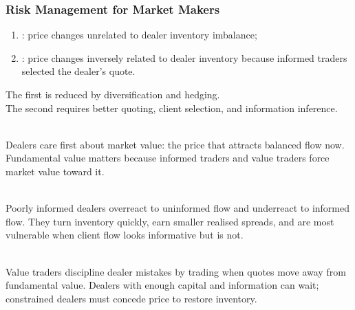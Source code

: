 \subsubsection{Risk Management for Market Makers}

\begin{taxonomy} 
\begin{enumerate}[label=\roman*.]
\setlength{\itemsep}{0pt}
\item {}: price changes unrelated to dealer inventory imbalance;
\item {}: price changes inversely related to dealer inventory because informed traders selected the dealer's quote.
\end{enumerate}
The first is reduced by diversification and hedging.\\
The second requires better quoting, client selection, and information inference.
\end{taxonomy}

\begin{principle} \\
Dealers care first about market value: the price that attracts balanced flow now. Fundamental value matters because informed traders and value traders force market value toward it.
\end{principle}

\begin{caveat} \\
Poorly informed dealers overreact to uninformed flow and underreact to informed flow. They turn inventory quickly, earn smaller realised spreads, and are most vulnerable when client flow looks informative but is not.
\end{caveat}

\begin{mechanism} \\
Value traders discipline dealer mistakes by trading when quotes move away from fundamental value. Dealers with enough capital and information can wait; constrained dealers must concede price to restore inventory.
\end{mechanism}
